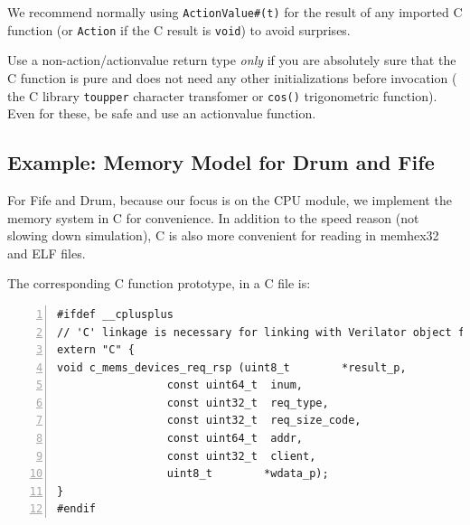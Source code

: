 We recommend normally using \verb|ActionValue#(t)| for the result of
any imported C function (or \verb|Action| if the C result is
\verb|void|) to avoid surprises.

Use a non-action/actionvalue return type \emph{only} if you are
absolutely sure that the C function is pure and does not need any
other initializations before invocation ({\eg} the C library
\verb|toupper| character transfomer or \verb|cos()| trigonometric
function).  Even for these, be safe and use an actionvalue function.


\subsection{Example: Memory Model for Drum and Fife}

For Fife and Drum, because our focus is on the CPU module, we
implement the memory system in C for convenience.  In addition to the
speed reason (not slowing down simulation), C is also more convenient
for reading in memhex32 and ELF files.



The corresponding C function prototype, in a C file is:

{\small
\begin{Verbatim}[frame=single, numbers=left]
#ifdef __cplusplus
// 'C' linkage is necessary for linking with Verilator object files
extern "C" {
void c_mems_devices_req_rsp (uint8_t        *result_p,
			     const uint64_t  inum,
			     const uint32_t  req_type,
			     const uint32_t  req_size_code,
			     const uint64_t  addr,
			     const uint32_t  client,
			     uint8_t        *wdata_p);
}
#endif
\end{Verbatim}
}

